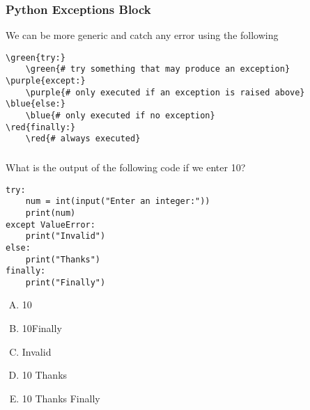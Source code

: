 \documentclass[xcolor=svgnames]{beamer}
\newcommand{\red}[1]{\textcolor{red}{#1}}
\newcommand{\green}[1]{\textcolor{ForestGreen}{#1}}
\newcommand{\blue}[1]{{\textcolor{blue}{#1}}}
\newcommand{\purple}[1]{{\textcolor{purple}{#1}}}
\newcommand{\ft}[1]{\frametitle{#1}}
\begin{document}
\begin{frame}[fragile]\ft{Python Exceptions Block}
We can be more generic and catch any error using the following
\begin{Verbatim}[xleftmargin=0.1in, commandchars=\\\{\}] 
\green{try:}
    \green{# try something that may produce an exception}
\purple{except:}
    \purple{# only executed if an exception is raised above}
\blue{else:}
    \blue{# only executed if no exception}
\red{finally:}
    \red{# always executed}
\end{Verbatim}
\end{frame}


\begin{frame}[fragile]\ft{}
  \begin{example}
  What is the output of the following code if we enter 10?
\begin{Verbatim}
try:
    num = int(input("Enter an integer:"))
    print(num)
except ValueError:
    print("Invalid")
else:
    print("Thanks")
finally:
    print("Finally")
\end{Verbatim}
\begin{multicols}{5}
\begin{enumerate}[A)]
\item 10 \newline\newline
\item 10\newline Finally \newline
\item Invalid\newline\newline
\item 10 \newline Thanks \newline
\item 10 \newline Thanks \newline Finally
\end{enumerate}
\end{multicols}
  \end{example} 
\end{frame}


\end{document}
